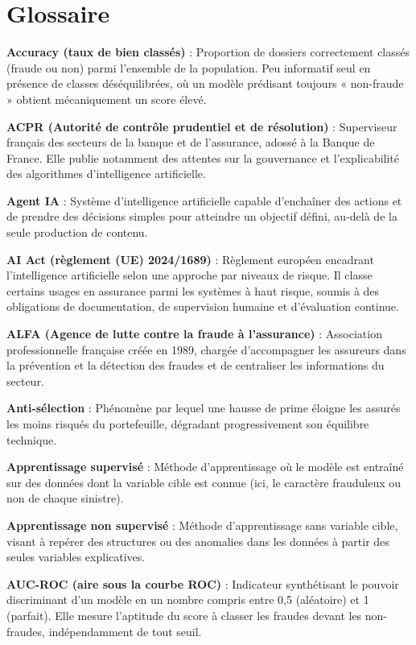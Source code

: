 \chapter*{Glossaire}
{}

\textbf{Accuracy (taux de bien classés)} : Proportion de dossiers correctement classés (fraude ou non) parmi l'ensemble de la population. Peu informatif seul en présence de classes déséquilibrées, où un modèle prédisant toujours « non-fraude » obtient mécaniquement un score élevé.

\textbf{ACPR (Autorité de contrôle prudentiel et de résolution)} : Superviseur français des secteurs de la banque et de l'assurance, adossé à la Banque de France. Elle publie notamment des attentes sur la gouvernance et l'explicabilité des algorithmes d'intelligence artificielle.

\textbf{Agent IA} : Système d'intelligence artificielle capable d'enchaîner des actions et de prendre des décisions simples pour atteindre un objectif défini, au-delà de la seule production de contenu.

\textbf{AI Act (règlement (UE) 2024/1689)} : Règlement européen encadrant l'intelligence artificielle selon une approche par niveaux de risque. Il classe certains usages en assurance parmi les systèmes à haut risque, soumis à des obligations de documentation, de supervision humaine et d'évaluation continue.

\textbf{ALFA (Agence de lutte contre la fraude à l'assurance)} : Association professionnelle française créée en 1989, chargée d'accompagner les assureurs dans la prévention et la détection des fraudes et de centraliser les informations du secteur.

\textbf{Anti-sélection} : Phénomène par lequel une hausse de prime éloigne les assurés les moins risqués du portefeuille, dégradant progressivement son équilibre technique.

\textbf{Apprentissage supervisé} : Méthode d'apprentissage où le modèle est entraîné sur des données dont la variable cible est connue (ici, le caractère frauduleux ou non de chaque sinistre).

\textbf{Apprentissage non supervisé} : Méthode d'apprentissage sans variable cible, visant à repérer des structures ou des anomalies dans les données à partir des seules variables explicatives.

\textbf{AUC-ROC (aire sous la courbe ROC)} : Indicateur synthétisant le pouvoir discriminant d'un modèle en un nombre compris entre 0,5 (aléatoire) et 1 (parfait). Elle mesure l'aptitude du score à classer les fraudes devant les non-fraudes, indépendamment de tout seuil.

